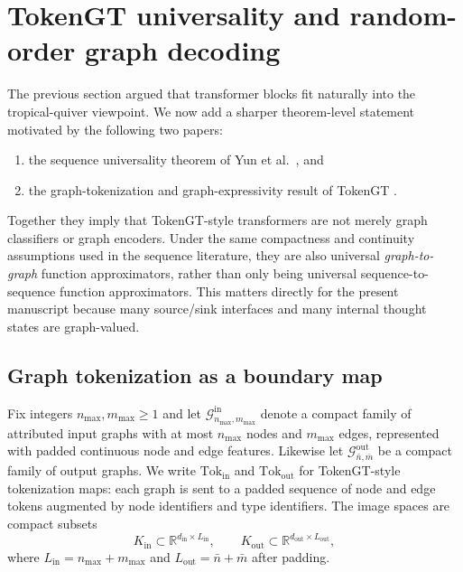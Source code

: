 \documentclass[11pt]{article}
\theoremstyle{definition}
\theoremstyle{plain}
\theoremstyle{remark}
\newcommand{\R}{\mathbb{R}}
\newcommand{\mc}[1]{\mathcal{#1}}
\begin{document}
\newpage

\section{TokenGT universality and random-order graph decoding}
\label{sec:tokengt-universality}

The previous section argued that transformer blocks fit naturally into the tropical-quiver viewpoint.
We now add a sharper theorem-level statement motivated by the following two papers:
\begin{enumerate}[leftmargin=2em]
\item the sequence universality theorem of Yun et al.\ \cite{YunBhojanapalliRawatKumarReddi2020}, and
\item the graph-tokenization and graph-expressivity result of TokenGT \cite{KimNguyenMinChoLeeLeeHong2022}.
\end{enumerate}
Together they imply that TokenGT-style transformers are not merely graph classifiers or graph encoders.
Under the same compactness and continuity assumptions used in the sequence literature, they are also universal \emph{graph-to-graph} function approximators, rather than only being universal sequence-to-sequence function approximators. This matters directly for the present manuscript because many source/sink interfaces and many internal thought states are graph-valued. 

\subsection{Graph tokenization as a boundary map}
\label{sec:graph-tokenization}

Fix integers $n_{\max},m_{\max}\ge 1$ and let $\mc{G}_{n_{\max},m_{\max}}^{\mathrm{in}}$ denote a compact family of attributed input graphs with at most $n_{\max}$ nodes and $m_{\max}$ edges, represented with padded continuous node and edge features.
Likewise let $\mc{G}_{\bar n,\bar m}^{\mathrm{out}}$ be a compact family of output graphs.
We write $\mathrm{Tok}_{\mathrm{in}}$ and $\mathrm{Tok}_{\mathrm{out}}$ for TokenGT-style tokenization maps:
each graph is sent to a padded sequence of node and edge tokens augmented by node identifiers and type identifiers.
The image spaces are compact subsets
\[
K_{\mathrm{in}} \subset \R^{d_{\mathrm{in}}\times L_{\mathrm{in}}},
\qquad
K_{\mathrm{out}} \subset \R^{d_{\mathrm{out}}\times L_{\mathrm{out}}},
\]
where $L_{\mathrm{in}}=n_{\max}+m_{\max}$ and $L_{\mathrm{out}}=\bar n+\bar m$ after padding.
\end{document}
